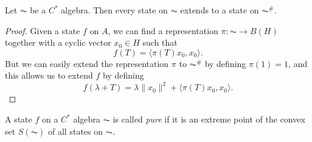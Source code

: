 \begin{corollary}
    Let $\AC$ be a $C^*$ algebra. Then every state on $\AC$ extends to a state on $\AC^\#$.
\end{corollary}
\begin{proof}
    Given a state $f$ on $A$, we can find a representation $\pi: \AC \to B(H)$ together with a cyclic vector $x_0 \in H$ such that
    \[ f(T) = \langle \pi(T) x_0, x_0 \rangle. \]
    But we can easily extend the representation $\pi$ to $\AC^\#$ by defining $\pi(1) = 1$, and this allows us to extend $f$ by defining
    \[ f(\lambda + T) = \lambda \| x_0 \|^2 + \langle \pi(T) x_0, x_0 \rangle. \]
\end{proof}

A state $f$ on a $C^*$ algebra $\AC$ is called \emph{pure} if it is an extreme point of the convex set $S(\AC)$ of all states on $\AC$.

